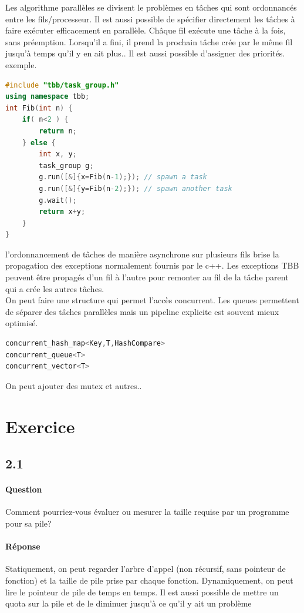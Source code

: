 \documentclass[oneside]{book}
\begin{document}
Les algorithme parallèles se divisent le problèmes en tâches qui sont ordonnancés entre les fils/processeur. Il est aussi possible de spécifier directement les tâches à faire exécuter efficacement en parallèle. Châque fil exécute une tâche à la fois, sans préemption. Lorsqu'il a fini, il prend la prochain tâche crée par le même fil jusqu'à temps qu'il y en ait plus.. Il est aussi possible d'assigner des priorités. \\

exemple.
\begin{lstlisting}[language=c++]
#include "tbb/task_group.h"
using namespace tbb;
int Fib(int n) {
	if( n<2 ) {
		return n;
	} else {
		int x, y;
		task_group g;
		g.run([&]{x=Fib(n-1);}); // spawn a task
		g.run([&]{y=Fib(n-2);}); // spawn another task
		g.wait();
		return x+y;
	}
}
\end{lstlisting}

l'ordonnancement de tâches de manière asynchrone sur plusieurs fils brise la propagation des exceptions normalement fournis par le c++. Les exceptions TBB peuvent être propagés d'un fil à l'autre pour remonter au fil de la tâche parent qui a crée les autres tâches.\\

On peut faire une structure qui permet l'accès concurrent. Les queues permettent de séparer des tâches parallèles mais un pipeline explicite est souvent mieux optimisé.
\begin{lstlisting}[language=c++]
concurrent_hash_map<Key,T,HashCompare>
concurrent_queue<T>
concurrent_vector<T>
\end{lstlisting}
On peut ajouter des mutex et autres..
\section{Exercice}
\subsection{2.1}
\paragraph{Question}
Comment pourriez-vous évaluer ou mesurer la taille requise par un programme
pour sa pile?
\paragraph{Réponse}
Statiquement, on peut regarder l'arbre d'appel (non récursif, sans pointeur de
fonction) et la taille de pile prise par chaque fonction. Dynamiquement, on peut
lire le pointeur de pile de temps en temps. Il est aussi possible de mettre un
quota sur la pile et de le diminuer jusqu'à ce qu'il y ait un problème
\end{document}
